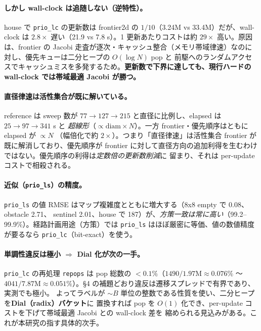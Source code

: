 \documentclass[11pt]{article}
\begin{document}
\paragraph{しかし wall-clock は追随しない（逆特性）。}
house で \texttt{prio\_lc} の更新数は frontier2d の $1/10$（3.24M vs 33.4M）だが、wall-clock は
$2.8\times$ 遅い（21.9 vs 7.8 s）。1 更新あたりコストは約 $29\times$ 高い。原因は、frontier の Jacobi
走査が逐次・キャッシュ整合（メモリ帯域律速）なのに対し、優先キューは二分ヒープの $O(\log N)$ pop と
前駆へのランダムアクセスでキャッシュミスを多発するため。\textbf{更新数で下界に達しても、現行ハードの
wall-clock では帯域最適 Jacobi が勝つ。}

\paragraph{直径律速は活性集合が既に解いている。}
reference は sweep 数が $77\to127\to215$ と直径に比例し、elapsed は $25\to97\to341$ s と
\emph{超線形}（$\propto \mathrm{diam}\times N$）。一方 frontier・優先順序はともに elapsed が $\propto N$
（幅倍化で約 $2\times$）。つまり「直径律速」は活性集合 frontier が既に解消しており、優先順序が
frontier に対して直径方向の追加利得を生むわけではない。優先順序の利得は\emph{定数倍の更新数削減}に
留まり、それは per-update コストで相殺される。

\paragraph{近似（\texttt{prio\_ls}）の精度。}
\texttt{prio\_ls} の値 RMSE はマップ複雑度とともに増大する（8x8 empty で 0.08、obstacle 2.71、
sentinel 2.01、house で 187）が、\emph{方策一致は常に高い}（99.2--99.9\%）。経路計画用途（方策）では
\texttt{prio\_ls} はほぼ厳密に等価、値の数値精度が要るなら \texttt{prio\_lc}（bit-exact）を使う。

\paragraph{単調性違反は極小 $\Rightarrow$ Dial 化が次の一手。}
\texttt{prio\_lc} の再処理 \texttt{repops} は pop 総数の $<0.1\%$（$1490/1.97\mathrm{M}\approx0.076\%$ 〜
$4041/7.87\mathrm{M}\approx0.051\%$）。\S4 の補題どおり違反は遷移スプレッドで有界であり、実測でも極小。
よってラベルが $\sim B$ 単位の整数である性質を使い、二分ヒープを\textbf{Dial（radix）バケット}に
置換すれば pop を $O(1)$ 化でき、per-update コストを下げて帯域最適 Jacobi との wall-clock 差を
縮められる見込みがある。これが本研究の指す具体的次手。
\end{document}
